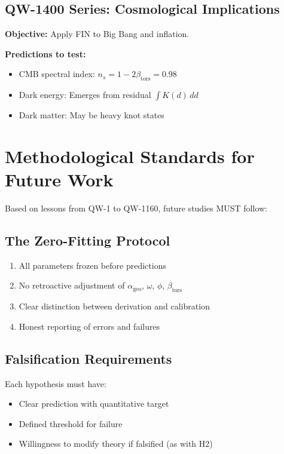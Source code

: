 \documentclass[11pt,a4paper]{book}
\theoremstyle{remark}
\newcommand{\alphageo}{\alpha_{\text{geo}}}
\newcommand{\betators}{\beta_{\text{tors}}}
\begin{document}
\subsection{QW-1400 Series: Cosmological Implications}

\textbf{Objective:} Apply FIN to Big Bang and inflation.

\textbf{Predictions to test:}
\begin{itemize}
    \item CMB spectral index: $n_s = 1 - 2\betators = 0.98$
    \item Dark energy: Emerges from residual $\int K(d) \, dd$
    \item Dark matter: May be heavy knot states
\end{itemize}

\section{Methodological Standards for Future Work}

Based on lessons from QW-1 to QW-1160, future studies MUST follow:

\subsection{The Zero-Fitting Protocol}

\begin{enumerate}
    \item All parameters frozen before predictions
    \item No retroactive adjustment of $\alphageo$, $\omega$, $\phi$, $\betators$
    \item Clear distinction between derivation and calibration
    \item Honest reporting of errors and failures
\end{enumerate}

\subsection{Falsification Requirements}

Each hypothesis must have:
\begin{itemize}
    \item Clear prediction with quantitative target
    \item Defined threshold for failure
    \item Willingness to modify theory if falsified (as with H2)
\end{itemize}
\end{document}
